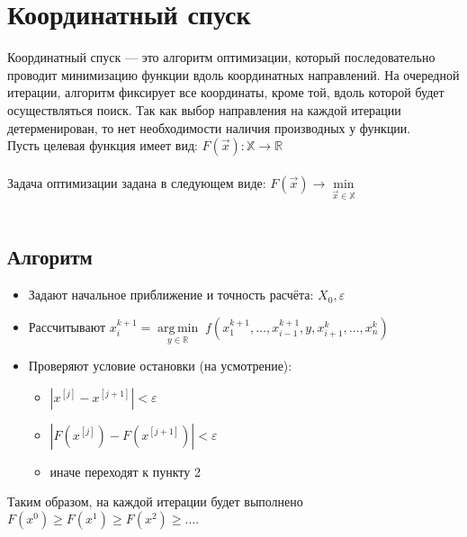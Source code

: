 \documentclass{article}
\begin{document}
    \newpage
    \section{Координатный спуск}
    Координатный спуск — это алгоритм оптимизации, который последовательно проводит минимизацию функции вдоль координатных направлений. На очередной итерации, алгоритм фиксирует все координаты, кроме той, вдоль которой будет осуществляться поиск. Так как выбор направления на каждой итерации детерменирован, то нет необходимости наличия производных у функции.\\


    Пусть целевая функция имеет вид:
    $F(\vec{x}): \mathbb{X} \rightarrow \mathbb{R}$\\\\
    Задача оптимизации задана в следующем виде:
    $F(\vec{x}) \rightarrow    \underset{\vec{x} \in \mathbb{X}}{\min}$\\\\


    \subsection{Алгоритм}
    \begin{itemize}
        \item Задают начальное приближение и точность расчёта: $X_0, \varepsilon$
        \item Рассчитывают ${\displaystyle x_{i}^{k+1}={\underset {y\in \mathbb {R} }{\operatorname {arg\,min} }}\;f(x_{1}^{k+1},\dots ,x_{i-1}^{k+1},y,x_{i+1}^{k},\dots ,x_{n}^{k})}$
        \item Проверяют условие остановки (на усмотрение):
        \begin{itemize}
            \item $|x^{[j]}-x^{[j+1]}|<\varepsilon$
            \item $|F(x^{[j]})-F(x^{[j+1]})|<\varepsilon$
            \item иначе переходят к пункту 2
        \end{itemize}
    \end{itemize}

    Таким образом, на каждой итерации будет выполнено
    ${\displaystyle F({x} ^{0})\geqslant F({x} ^{1})\geqslant F({x} ^{2})\geqslant \dots .}$
\end{document}

